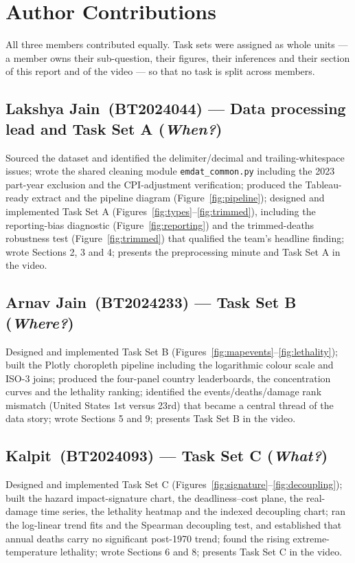 \documentclass[11pt,a4paper]{article}
\newcommand{\memberA}{Lakshya Jain}
\newcommand{\rollA}{BT2024044}
\newcommand{\memberB}{Arnav Jain}
\newcommand{\rollB}{BT2024233}
\newcommand{\memberC}{Kalpit}
\newcommand{\rollC}{BT2024093}
\begin{document}
\section{Author Contributions}
\label{sec:contrib}

All three members contributed equally. Task sets were assigned as whole units ---
a member owns their sub-question, their figures, their inferences and their
section of this report and of the video --- so that no task is split across
members.

\subsection*{\memberA~(\rollA) --- Data processing lead and Task Set A (\emph{When?})}
Sourced the dataset and identified the delimiter/decimal and trailing-whitespace
issues; wrote the shared cleaning module \texttt{emdat\_common.py} including the
2023 part-year exclusion and the CPI-adjustment verification; produced the
Tableau-ready extract and the pipeline diagram (Figure~\ref{fig:pipeline});
designed and implemented Task Set A (Figures~\ref{fig:types}--\ref{fig:trimmed}),
including the reporting-bias diagnostic (Figure~\ref{fig:reporting}) and the
trimmed-deaths robustness test (Figure~\ref{fig:trimmed}) that qualified the
team's headline finding; wrote Sections 2, 3 and 4; presents the preprocessing
minute and Task Set A in the video.

\subsection*{\memberB~(\rollB) --- Task Set B (\emph{Where?})}
Designed and implemented Task Set B
(Figures~\ref{fig:mapevents}--\ref{fig:lethality}); built the Plotly choropleth
pipeline including the logarithmic colour scale and ISO-3 joins; produced the
four-panel country leaderboards, the concentration curves and the lethality
ranking; identified the events/deaths/damage rank mismatch (United States 1st
versus 23rd) that became a central thread of the data story; wrote Sections 5 and
9; presents Task Set B in the video.

\subsection*{\memberC~(\rollC) --- Task Set C (\emph{What?})}
Designed and implemented Task Set C
(Figures~\ref{fig:signature}--\ref{fig:decoupling}); built the hazard
impact-signature chart, the deadliness--cost plane, the real-damage time series,
the lethality heatmap and the indexed decoupling chart; ran the log-linear trend
fits and the Spearman decoupling test, and established that annual deaths carry
no significant post-1970 trend; found the rising extreme-temperature lethality;
wrote Sections 6 and 8; presents Task Set C in the video.
\end{document}
